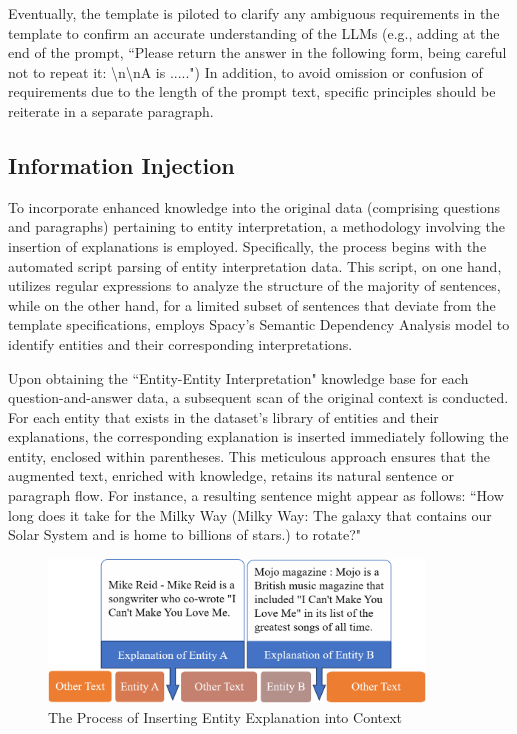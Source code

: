 \documentclass[a4paper,fleqn,twocolumn]{cas-dc}
\newcommand{\1}[1]{\mathds{1}\left[#1\right]}
\begin{document}
	Eventually, the template is piloted to clarify any ambiguous requirements in the template to confirm an accurate understanding of the LLMs (e.g., adding at the end of the prompt, ``Please return the answer in the following form, being careful not to repeat it: \textbackslash n\textbackslash nA is .....")  In addition, to avoid omission or confusion of requirements due to the length of the prompt text, specific principles should be reiterate in a separate paragraph.
	
\subsection{Information Injection}

	To incorporate enhanced knowledge into the original data (comprising questions and paragraphs) pertaining to entity interpretation, a methodology involving the insertion of explanations is employed. Specifically, the process begins with the automated script parsing of entity interpretation data. This script, on one hand, utilizes regular expressions to analyze the structure of the majority of sentences, while on the other hand, for a limited subset of sentences that deviate from the template specifications, employs Spacy's Semantic Dependency Analysis model to identify entities and their corresponding interpretations.
	
	Upon obtaining the ``Entity-Entity Interpretation" knowledge base for each question-and-answer data, a subsequent scan of the original context is conducted. For each entity that exists in the dataset's library of entities and their explanations, the corresponding explanation is inserted immediately following the entity, enclosed within parentheses. This meticulous approach ensures that the augmented text, enriched with knowledge, retains its natural sentence or paragraph flow. For instance, a resulting sentence might appear as follows: ``How long does it take for the Milky Way (Milky Way: The galaxy that contains our Solar System and is home to billions of stars.) to rotate?" 
	
	\label{sec:information_injection}
	\begin{figure}[h]
		\centering
		\includegraphics[width=10cm]{EntityInsert.png}
		\caption{The Process of Inserting Entity Explanation into Context}
		\label{fig:entity_insertion}
	\end{figure}
\end{document}
